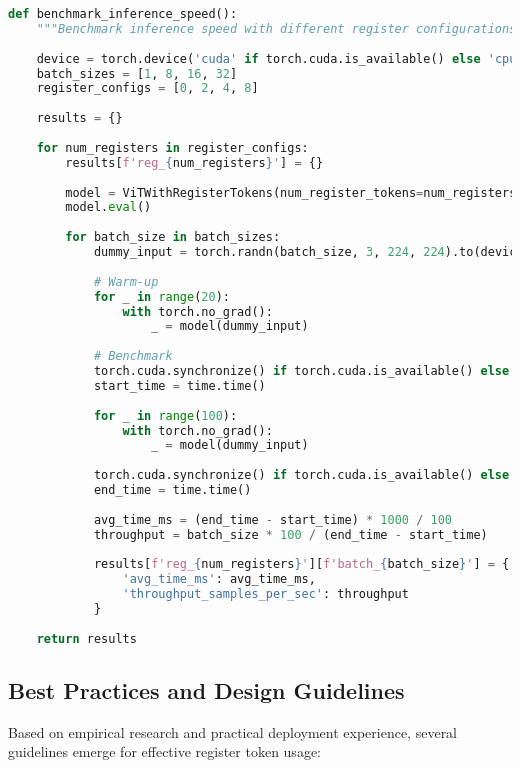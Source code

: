 \begin{lstlisting}[language=Python, caption=Profiling computational impact of register tokens]
def benchmark_inference_speed():
    """Benchmark inference speed with different register configurations."""
    
    device = torch.device('cuda' if torch.cuda.is_available() else 'cpu')
    batch_sizes = [1, 8, 16, 32]
    register_configs = [0, 2, 4, 8]
    
    results = {}
    
    for num_registers in register_configs:
        results[f'reg_{num_registers}'] = {}
        
        model = ViTWithRegisterTokens(num_register_tokens=num_registers).to(device)
        model.eval()
        
        for batch_size in batch_sizes:
            dummy_input = torch.randn(batch_size, 3, 224, 224).to(device)
            
            # Warm-up
            for _ in range(20):
                with torch.no_grad():
                    _ = model(dummy_input)
            
            # Benchmark
            torch.cuda.synchronize() if torch.cuda.is_available() else None
            start_time = time.time()
            
            for _ in range(100):
                with torch.no_grad():
                    _ = model(dummy_input)
            
            torch.cuda.synchronize() if torch.cuda.is_available() else None
            end_time = time.time()
            
            avg_time_ms = (end_time - start_time) * 1000 / 100
            throughput = batch_size * 100 / (end_time - start_time)
            
            results[f'reg_{num_registers}'][f'batch_{batch_size}'] = {
                'avg_time_ms': avg_time_ms,
                'throughput_samples_per_sec': throughput
            }
    
    return results
\end{lstlisting}

\subsection{Best Practices and Design Guidelines}

Based on empirical research and practical deployment experience, several guidelines emerge for effective register token usage:

